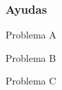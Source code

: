 \documentclass{beamer}
\begin{document}
		\begin{frame}[fragile]
			\frametitle{Ayudas}
			\begin{block}{Problema A}
			
			\end{block}
			\begin{block}{Problema B}
				
			\end{block}
			\begin{block}{Problema C}
				
			\end{block}
		\end{frame}
\end{document}
